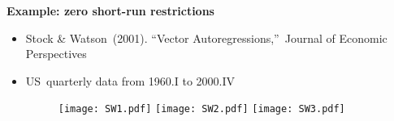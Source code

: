 \documentclass[10pt,handout]{beamer}
\begin{document}
\begin{frame}
{\textbf{Example: zero short-run restrictions}}

\begin{itemize}
\item Stock \& Watson\ (2001). \textquotedblleft Vector
Autoregressions,\textquotedblright\ Journal of Economic
Perspectives\smallskip

\item US\ quarterly data from 1960.I to 2000.IV 
\begin{figure}[h]
\centering\texttt{[image: SW1.pdf]} %
\texttt{[image: SW2.pdf]} \texttt{[image: SW3.pdf]}
\end{figure}
\end{itemize}
\end{frame}

\vspace{.1cm}
\end{document}
